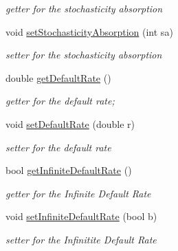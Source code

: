 \begin{DoxyCompactItemize}
\begin{DoxyCompactList}\small\item\em getter for the stochasticity absorption \end{DoxyCompactList}\item 
\hypertarget{class_p_h_a78fb558177760ed0e640d8a0aaf8b06a}{void \hyperlink{class_p_h_a78fb558177760ed0e640d8a0aaf8b06a}{set\-Stochasticity\-Absorption} (int sa)}\label{class_p_h_a78fb558177760ed0e640d8a0aaf8b06a}

\begin{DoxyCompactList}\small\item\em setter for the stochasticity absorption \end{DoxyCompactList}\item 
\hypertarget{class_p_h_aa64e3d43f773122df2329491f6abdf6c}{double \hyperlink{class_p_h_aa64e3d43f773122df2329491f6abdf6c}{get\-Default\-Rate} ()}\label{class_p_h_aa64e3d43f773122df2329491f6abdf6c}

\begin{DoxyCompactList}\small\item\em getter for the default rate; \end{DoxyCompactList}\item 
\hypertarget{class_p_h_ae49be2823d5a2a7c6517b6783cf9fdfa}{void \hyperlink{class_p_h_ae49be2823d5a2a7c6517b6783cf9fdfa}{set\-Default\-Rate} (double r)}\label{class_p_h_ae49be2823d5a2a7c6517b6783cf9fdfa}

\begin{DoxyCompactList}\small\item\em setter for the default rate \end{DoxyCompactList}\item 
\hypertarget{class_p_h_a7ede855d04ee8e3a20beb159c5520003}{bool \hyperlink{class_p_h_a7ede855d04ee8e3a20beb159c5520003}{get\-Infinite\-Default\-Rate} ()}\label{class_p_h_a7ede855d04ee8e3a20beb159c5520003}

\begin{DoxyCompactList}\small\item\em getter for the \-Infinite \-Default \-Rate \end{DoxyCompactList}\item 
\hypertarget{class_p_h_acc38a15dc0e29ddfd2c8ae7d3371f7ab}{void \hyperlink{class_p_h_acc38a15dc0e29ddfd2c8ae7d3371f7ab}{set\-Infinite\-Default\-Rate} (bool b)}\label{class_p_h_acc38a15dc0e29ddfd2c8ae7d3371f7ab}

\begin{DoxyCompactList}\small\item\em setter for the \-Infinitite \-Default \-Rate \end{DoxyCompactList}\end{DoxyCompactItemize}
